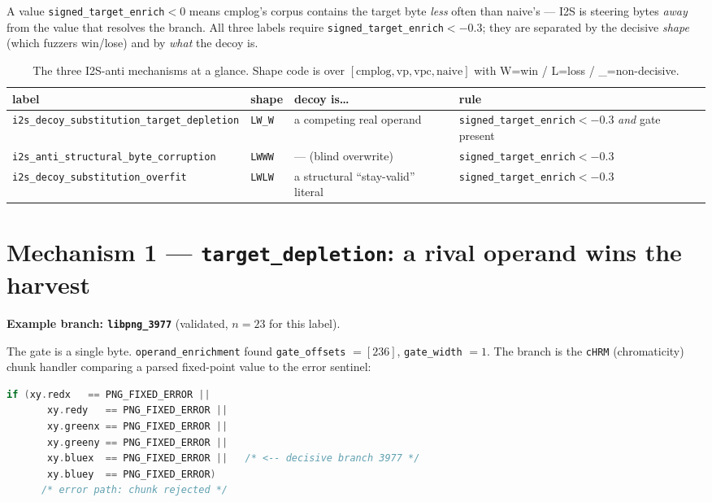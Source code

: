 \documentclass[11pt]{article}
\newcommand{\ste}{\texttt{signed\_target\_enrich}}
\begin{document}
\noindent A value \ste{}$<0$ means cmplog's corpus contains the target byte
\emph{less} often than naive's --- I2S is steering bytes \emph{away} from the
value that resolves the branch. All three labels require
\ste{}$<-0.3$; they are separated by the decisive \emph{shape} (which fuzzers
win/lose) and by \emph{what} the decoy is.

\begin{table}[h]\centering
\caption{The three I2S-anti mechanisms at a glance. Shape code is over
$[\text{cmplog},\text{vp},\text{vpc},\text{naive}]$ with W=win / L=loss /
\_=non-decisive.}
\label{tab:overview}
\begin{tabular}{@{}llll@{}}
\toprule
label & shape & decoy is\ldots & rule \\
\midrule
\texttt{i2s\_decoy\_substitution\_target\_depletion} & \texttt{LW\_W} &
  a competing real operand & \ste{}$<-0.3$ \emph{and} gate present \\
\texttt{i2s\_anti\_structural\_byte\_corruption}     & \texttt{LWWW} &
  --- (blind overwrite) & \ste{}$<-0.3$ \\
\texttt{i2s\_decoy\_substitution\_overfit}           & \texttt{LWLW} &
  a structural ``stay-valid'' literal & \ste{}$<-0.3$ \\
\bottomrule
\end{tabular}
\end{table}

\section{Mechanism 1 --- \texttt{target\_depletion}: a rival operand wins the harvest}
\label{sec:depletion}
\textbf{Example branch: \texttt{libpng\_3977}} (validated, $n=23$ for this label).

The gate is a single byte. \texttt{operand\_enrichment} found
\texttt{gate\_offsets} $=[236]$, \texttt{gate\_width} $=1$. The branch is the
\texttt{cHRM} (chromaticity) chunk handler comparing a parsed fixed-point value
to the error sentinel:

\begin{lstlisting}[style=src,language=C,
  caption={\texttt{/src/libpng/pngrutil.c:1283}, \texttt{OSS\_FUZZ\_png\_handle\_cHRM}.
  The gate byte at input offset 236 feeds \texttt{xy.bluex}.},label={lst:libpng}]
   if (xy.redx   == PNG_FIXED_ERROR ||
       xy.redy   == PNG_FIXED_ERROR ||
       xy.greenx == PNG_FIXED_ERROR ||
       xy.greeny == PNG_FIXED_ERROR ||
       xy.bluex  == PNG_FIXED_ERROR ||   /* <-- decisive branch 3977 */
       xy.bluey  == PNG_FIXED_ERROR)
      /* error path: chunk rejected */
\end{lstlisting}
\end{document}
